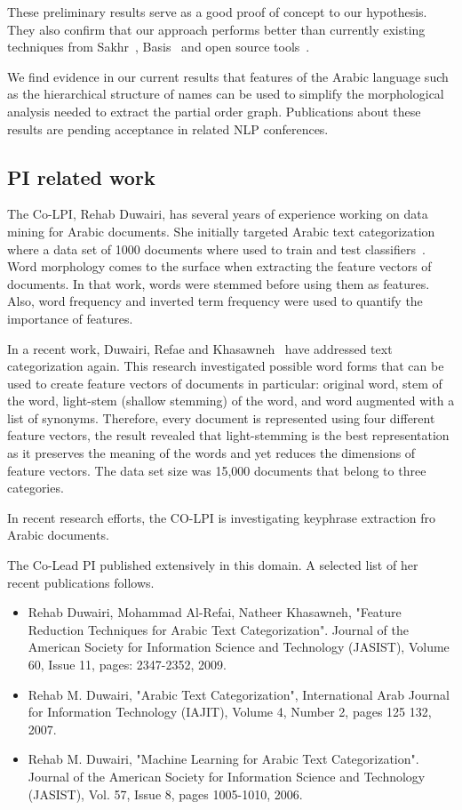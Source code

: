 \documentclass[12pt]{article}
\begin{document}
These preliminary results serve as a good proof of concept to our 
hypothesis. They also confirm that our approach performs better than 
currently existing techniques from Sakhr~\cite{Sak09},
Basis~\cite{Bas09} and open source 
tools~\cite{Col09,Otakar:07,Tim04}.

We find evidence in our current results that features 
of the Arabic language such as the hierarchical structure of
names can be used to simplify the morphological analysis
needed to extract the partial order graph. 
Publications about these results are pending acceptance in 
related NLP conferences. 

\subsection{PI related work}

The Co-LPI, Rehab Duwairi, has several years of experience 
working on data mining for Arabic documents. 
She initially targeted Arabic text categorization where a 
data set of 1000 documents where used to train and test 
classifiers~\cite{Duw06,Duw07}.
Word morphology comes to the surface when extracting the 
feature vectors of documents. 
In that work, words were stemmed before using them as features. 
Also, word frequency and inverted term frequency were used to 
quantify the importance of features. 

In a recent work, Duwairi, Refae and Khasawneh~\cite{Duw09}
have addressed text categorization again. 
This research investigated possible word forms that can be 
used to create feature vectors of documents in particular: 
original word, stem of the word, light-stem (shallow stemming) 
of the word, and word augmented with a list of synonyms. 
Therefore, every document is represented using four different 
feature vectors, the result revealed that light-stemming is the 
best representation as it preserves the meaning of the words 
and yet reduces the dimensions of feature vectors. 
The data set size was 15,000 documents that belong to three 
categories. 

In recent research efforts, the CO-LPI is investigating 
keyphrase extraction fro Arabic documents.

The Co-Lead PI published extensively in this domain. 
A selected list of her recent publications follows. 
\begin{itemize}\itemsep0pt
\item Rehab Duwairi, Mohammad Al-Refai, Natheer Khasawneh, 
"Feature Reduction Techniques for Arabic Text Categorization". 
Journal of the American Society for Information Science and Technology 
(JASIST), Volume 60, Issue 11, pages: 2347-2352, 2009. 
\item Rehab M. Duwairi, "Arabic Text Categorization", 
International Arab Journal for Information Technology (IAJIT), 
Volume 4, Number 2, pages 125  132, 2007.
\item Rehab M. Duwairi, "Machine Learning for Arabic Text Categorization". 
Journal of the American Society for Information Science and Technology 
(JASIST), Vol. 57, Issue 8, pages 1005-1010, 2006.
\end{itemize}
\end{document}
